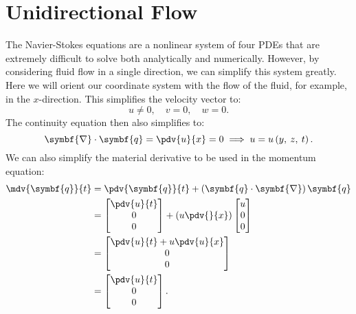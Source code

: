 \documentclass{article}
\theoremstyle{definition}
\begin{document}
\section{Unidirectional Flow}
The Navier-Stokes equations are a nonlinear system of four PDEs that
are extremely difficult to solve both analytically and numerically.
However, by considering fluid flow in a single direction, we can
simplify this system greatly. Here we will orient our coordinate system
with the flow of the fluid, for example, in the \(x\)-direction. This
simplifies the velocity vector to:
\begin{equation*}
    u \neq 0, \quad v = 0, \quad w = 0.
\end{equation*}
The continuity equation then also simplifies to:
\begin{equation*}
    \symbf{\nabla} \cdot \symbf{q} = \pdv{u}{x} = 0 \implies u = u\left( y,\: z,\: t \right).
\end{equation*}
We can also simplify the material derivative to be used in the momentum
equation:
\begin{align*}
    \mdv{\symbf{q}}{t} & = \pdv{\symbf{q}}{t} + \left( \symbf{q} \cdot \symbf{\nabla} \right) \symbf{q} \\
                       & =
    \begin{bmatrix}
        \displaystyle\pdv{u}{t} \\
        0                       \\
        0
    \end{bmatrix}
    + \left( u \pdv{}{x} \right)
    \begin{bmatrix}
        u \\
        0 \\
        0
    \end{bmatrix}
    \\
                       & =
    \begin{bmatrix}
        \displaystyle\pdv{u}{t} + u \pdv{u}{x} \\
        0                                      \\
        0
    \end{bmatrix}
    \\
                       & =
    \begin{bmatrix}
        \displaystyle\pdv{u}{t} \\
        0                       \\
        0
    \end{bmatrix}
    .
\end{align*}
\end{document}
